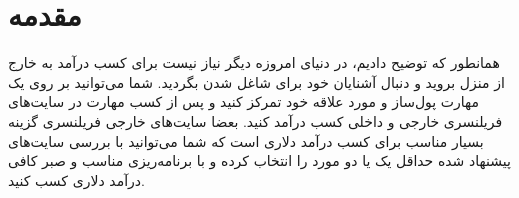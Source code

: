 
\section*{مقدمه}
همانطور که توضیح دادیم، در دنیای امروزه دیگر نیاز نیست برای کسب درآمد به خارج از منزل بروید و دنبال آشنایان خود برای شاغل شدن بگردید. شما می‌توانید بر روی یک مهارت پول‌ساز و مورد علاقه خود تمرکز کنید و پس از کسب مهارت در سایت‌های فریلنسری خارجی و داخلی کسب درآمد کنید. بعضا سایت‌های خارجی فریلنسری گزینه بسیار مناسب برای کسب درآمد دلاری است که شما می‌توانید با بررسی سایت‌های پیشنهاد شده حداقل یک یا دو مورد را انتخاب کرده و با برنامه‌ریزی مناسب و صبر کافی درآمد دلاری کسب کنید.

